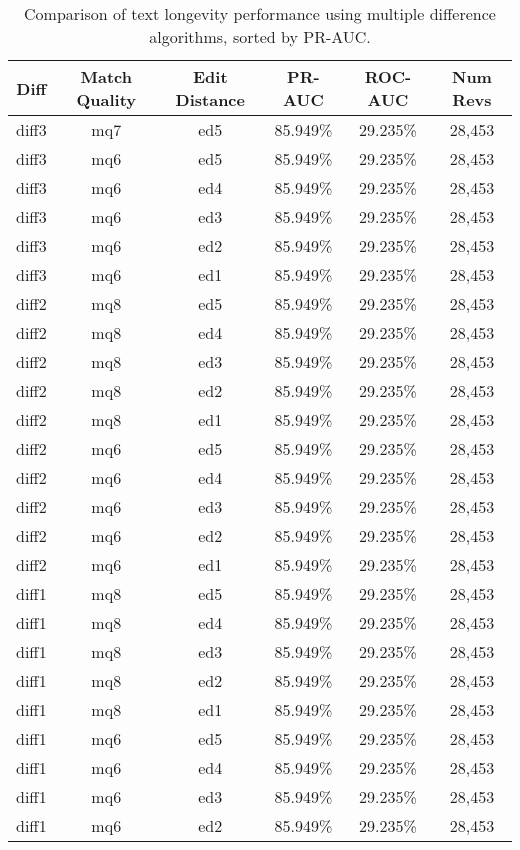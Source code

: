 \begin{table}[tbph]
\begin{center}
\begin{tabular}{|c|c|c||c|c|c|}
\hline
Diff & Match Quality & Edit Distance & PR-AUC & ROC-AUC & Num Revs \\
\hline
\hline
diff3 & mq7 & ed5 & 85.949\% & 29.235\% & 28,453 \\
diff3 & mq6 & ed5 & 85.949\% & 29.235\% & 28,453 \\
diff3 & mq6 & ed4 & 85.949\% & 29.235\% & 28,453 \\
diff3 & mq6 & ed3 & 85.949\% & 29.235\% & 28,453 \\
diff3 & mq6 & ed2 & 85.949\% & 29.235\% & 28,453 \\
diff3 & mq6 & ed1 & 85.949\% & 29.235\% & 28,453 \\
diff2 & mq8 & ed5 & 85.949\% & 29.235\% & 28,453 \\
diff2 & mq8 & ed4 & 85.949\% & 29.235\% & 28,453 \\
diff2 & mq8 & ed3 & 85.949\% & 29.235\% & 28,453 \\
diff2 & mq8 & ed2 & 85.949\% & 29.235\% & 28,453 \\
diff2 & mq8 & ed1 & 85.949\% & 29.235\% & 28,453 \\
diff2 & mq6 & ed5 & 85.949\% & 29.235\% & 28,453 \\
diff2 & mq6 & ed4 & 85.949\% & 29.235\% & 28,453 \\
diff2 & mq6 & ed3 & 85.949\% & 29.235\% & 28,453 \\
diff2 & mq6 & ed2 & 85.949\% & 29.235\% & 28,453 \\
diff2 & mq6 & ed1 & 85.949\% & 29.235\% & 28,453 \\
diff1 & mq8 & ed5 & 85.949\% & 29.235\% & 28,453 \\
diff1 & mq8 & ed4 & 85.949\% & 29.235\% & 28,453 \\
diff1 & mq8 & ed3 & 85.949\% & 29.235\% & 28,453 \\
diff1 & mq8 & ed2 & 85.949\% & 29.235\% & 28,453 \\
diff1 & mq8 & ed1 & 85.949\% & 29.235\% & 28,453 \\
diff1 & mq6 & ed5 & 85.949\% & 29.235\% & 28,453 \\
diff1 & mq6 & ed4 & 85.949\% & 29.235\% & 28,453 \\
diff1 & mq6 & ed3 & 85.949\% & 29.235\% & 28,453 \\
diff1 & mq6 & ed2 & 85.949\% & 29.235\% & 28,453 \\
\hline
\end{tabular}
\end{center}
\caption{Comparison of text longevity performance using
    multiple difference algorithms, sorted by PR-AUC.}
\label{tab:textshoutH}
\end{table}
